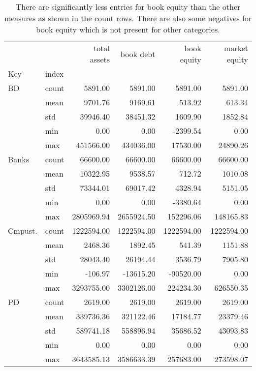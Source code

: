 \begin{table}
\caption{There are significantly less entries for book equity than the other measures as shown in the count rows. There are also some negatives for book equity which is not present for other categories. }
\label{tab:Table 2.1}
\begin{tabular}{llrrrr}
\toprule
 &  & total assets & book debt & book equity & market equity \\
Key & index &  &  &  &  \\
\midrule
{BD} & count & 5891.00 & 5891.00 & 5891.00 & 5891.00 \\
 & mean & 9701.76 & 9169.61 & 513.92 & 613.34 \\
 & std & 39946.40 & 38451.32 & 1609.90 & 1852.84 \\
 & min & 0.00 & 0.00 & -2399.54 & 0.00 \\
 & max & 451566.00 & 434036.00 & 17530.00 & 24890.26 \\
\cline{1-6}
{Banks} & count & 66600.00 & 66600.00 & 66600.00 & 66600.00 \\
 & mean & 10322.95 & 9538.57 & 712.72 & 1010.08 \\
 & std & 73344.01 & 69017.42 & 4328.94 & 5151.05 \\
 & min & 0.00 & 0.00 & -3380.64 & 0.00 \\
 & max & 2805969.94 & 2655924.50 & 152296.06 & 148165.83 \\
\cline{1-6}
{Cmpust.} & count & 1222594.00 & 1222594.00 & 1222594.00 & 1222594.00 \\
 & mean & 2468.36 & 1892.45 & 541.39 & 1151.88 \\
 & std & 28043.40 & 26194.44 & 3536.79 & 7905.80 \\
 & min & -106.97 & -13615.20 & -90520.00 & 0.00 \\
 & max & 3293755.00 & 3302126.00 & 224234.30 & 626550.35 \\
\cline{1-6}
{PD} & count & 2619.00 & 2619.00 & 2619.00 & 2619.00 \\
 & mean & 339736.36 & 321122.46 & 17184.77 & 23379.46 \\
 & std & 589741.18 & 558896.94 & 35686.52 & 43093.83 \\
 & min & 0.00 & 0.00 & 0.00 & 0.00 \\
 & max & 3643585.13 & 3586633.39 & 257683.00 & 273598.07 \\
\cline{1-6}
\bottomrule
\end{tabular}
\end{table}
